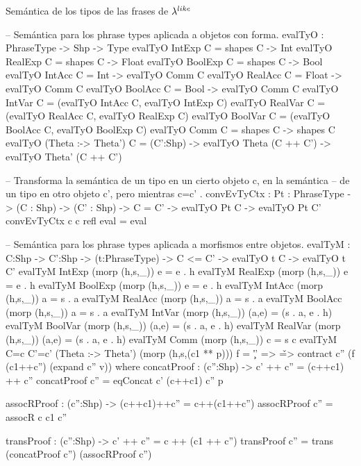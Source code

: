 \noindent Sem\'antica de los tipos de las frases de $\lambda^{like}$
\begin{code}
-- Semántica para los phrase types aplicada a objetos con forma.
evalTyO : PhraseType -> Shp -> Type
evalTyO IntExp             C = shapes C -> Int
evalTyO RealExp            C = shapes C -> Float
evalTyO BoolExp            C = shapes C -> Bool
evalTyO IntAcc             C = Int -> evalTyO Comm C
evalTyO RealAcc            C = Float -> evalTyO Comm C
evalTyO BoolAcc            C = Bool -> evalTyO Comm C
evalTyO IntVar             C = (evalTyO IntAcc  C, evalTyO IntExp C)
evalTyO RealVar            C = (evalTyO RealAcc C, evalTyO RealExp C)
evalTyO BoolVar            C = (evalTyO BoolAcc C, evalTyO BoolExp C)
evalTyO Comm               C = shapes C -> shapes C
evalTyO (Theta :-> Theta') C = (C':Shp) -> evalTyO Theta (C ++ C') -> evalTyO Theta' (C ++ C')

-- Transforma la semántica de un tipo en un cierto objeto c, en la semántica
-- de un tipo en otro objeto c', pero mientras c=c' .
convEvTyCtx : {Pt : PhraseType} -> (C : Shp) -> (C' : Shp) -> C = C' -> 
              evalTyO Pt C -> evalTyO Pt C'
convEvTyCtx c c refl eval = eval

-- Semántica para los phrase types aplicada a morfismos entre objetos.
evalTyM : {C:Shp} -> {C':Shp} -> (t:PhraseType) -> C <= C' -> evalTyO t C -> evalTyO t C'
evalTyM IntExp             (morp (h,s,_)) e         = e . h
evalTyM RealExp            (morp (h,s,_)) e         = e . h
evalTyM BoolExp            (morp (h,s,_)) e         = e . h
evalTyM IntAcc             (morp (h,s,_)) a         = s . a
evalTyM RealAcc            (morp (h,s,_)) a         = s . a
evalTyM BoolAcc            (morp (h,s,_)) a         = s . a
evalTyM IntVar             (morp (h,s,_)) (a,e)     = (s . a, e . h)
evalTyM BoolVar            (morp (h,s,_)) (a,e)     = (s . a, e . h)
evalTyM RealVar            (morp (h,s,_)) (a,e)     = (s . a, e . h)
evalTyM Comm               (morp (h,s,_)) c         = s c
evalTyM {C=c} {C'=c'} (Theta :-> Theta') (morp (h,s,(c1 ** p))) f = 
                    \c'' => \v => contract c'' (f (c1++c'') (expand c'' v))
    where
        concatProof : (c'':Shp) -> c' ++ c'' = (c++c1) ++ c''
        concatProof c'' = eqConcat c' (c++c1) c'' p
        
        assocRProof : (c'':Shp) -> (c++c1)++c'' = c++(c1++c'')
        assocRProof c'' = assocR c c1 c''
        
        transProof : (c'':Shp) -> c' ++ c'' = c ++ (c1 ++ c'')
        transProof c'' = trans (concatProof c'') (assocRProof c'')
        

\end{code}
